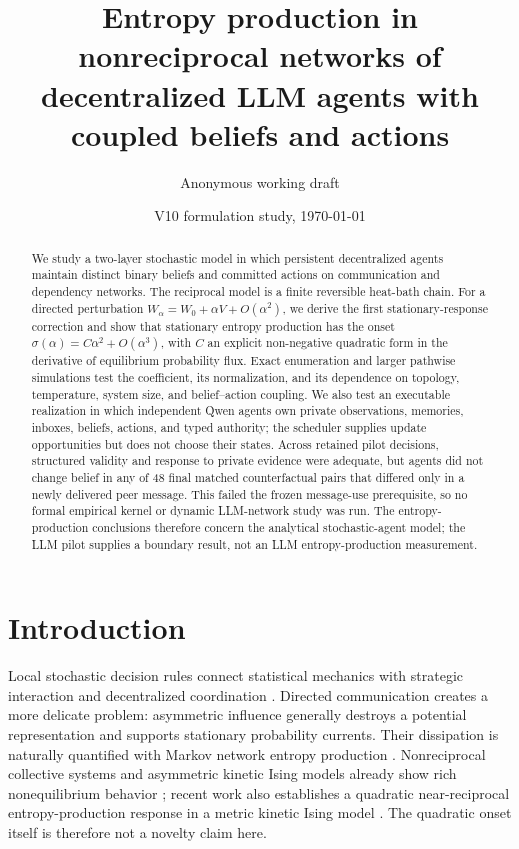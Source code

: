 \documentclass[12pt]{article}
\title{Entropy production in nonreciprocal networks of decentralized LLM agents with coupled beliefs and actions}
\author{Anonymous working draft}
\date{V10 formulation study, \today}
\begin{document}
\maketitle

\begin{abstract}
We study a two-layer stochastic model in which persistent decentralized agents
maintain distinct binary beliefs and committed actions on communication and
dependency networks.  The reciprocal model is a finite reversible heat-bath
chain.  For a directed perturbation $W_\alpha=W_0+\alpha V+O(\alpha^2)$, we
derive the first stationary-response correction and show that stationary
entropy production has the onset
$\sigma(\alpha)=C\alpha^2+O(\alpha^3)$, with $C$ an explicit non-negative
quadratic form in the derivative of equilibrium probability flux. Exact
enumeration and larger pathwise simulations test the coefficient, its
normalization, and its dependence on topology, temperature, system size, and
belief--action coupling. We also test an executable realization in which
independent Qwen agents own private observations, memories, inboxes, beliefs,
actions, and typed authority; the scheduler supplies update opportunities but
does not choose their states. Across \ResultLLMDecisions{} retained pilot
decisions, structured validity and response to private evidence were adequate,
but agents did not change belief in any of 48 final matched counterfactual pairs
that differed only in a newly delivered peer message. This failed the frozen
message-use prerequisite, so no formal empirical kernel or dynamic LLM-network
study was run. The entropy-production conclusions therefore concern the
analytical stochastic-agent model; the LLM pilot supplies a boundary result,
not an LLM entropy-production measurement.
\end{abstract}

\section{Introduction}

Local stochastic decision rules connect statistical mechanics with strategic
interaction and decentralized coordination \cite{glauber1963,blume1993}.
Directed communication creates a more delicate problem: asymmetric influence
generally destroys a potential representation and supports stationary
probability currents.  Their dissipation is naturally quantified with Markov
network entropy production \cite{schnakenberg1976,seifert2012}.  Nonreciprocal
collective systems and asymmetric kinetic Ising models already show rich
nonequilibrium behavior \cite{fruchart2021,aguilera2021}; recent work also
establishes a quadratic near-reciprocal entropy-production response in a metric
kinetic Ising model \cite{dicarlo2025}.  The quadratic onset itself is therefore
not a novelty claim here.
\end{document}
